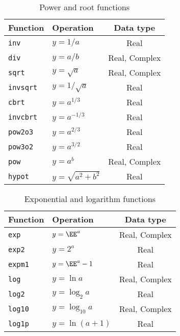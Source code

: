 \begin{table}
  \begin{tabularx}{\textwidth}{LLC}
    \toprule
    Function & Operation & Data type \\
    \midrule
    \texttt{inv}     & $y = 1 / a$            & Real          \\
    \texttt{div}     & $y = a / b$            & Real, Complex \\
    \texttt{sqrt}    & $y = \sqrt{a}$         & Real, Complex \\
    \texttt{invsqrt} & $y = 1 / \sqrt{a}$     & Real          \\
    \texttt{cbrt}    & $y = a^{1/3}$          & Real          \\
    \texttt{invcbrt} & $y = a^{-1/3}$         & Real          \\
    \texttt{pow2o3}  & $y = a^{2/3}$          & Real          \\
    \texttt{pow3o2}  & $y = a^{3/2}$          & Real          \\
    \texttt{pow}     & $y = a^b$              & Real, Complex \\
    \texttt{hypot}   & $y = \sqrt{a^2 + b^2}$ & Real          \\
    \bottomrule
  \end{tabularx}
  \caption{Power and root functions}
  \label{tab:Power and root functions}
\end{table}

\begin{table}
  \begin{tabularx}{\textwidth}{LLC}
    \toprule
    Function & Operation & Data type \\
    \midrule
    \texttt{exp}   & $y = \EE^a$       & Real, Complex \\
    \texttt{exp2}  & $y = 2^a$         & Real          \\
    \texttt{expm1} & $y = \EE^a - 1$   & Real          \\
    \texttt{log}   & $y = \ln a$       & Real, Complex \\
    \texttt{log2}  & $y = \log_2 a$    & Real          \\
    \texttt{log10} & $y = \log_{10} a$ & Real, Complex \\
    \texttt{log1p} & $y = \ln(a + 1)$  & Real          \\
    \bottomrule
  \end{tabularx}
  \caption{Exponential and logarithm functions}
  \label{tab:Exponential and logarithm functions}
\end{table}

